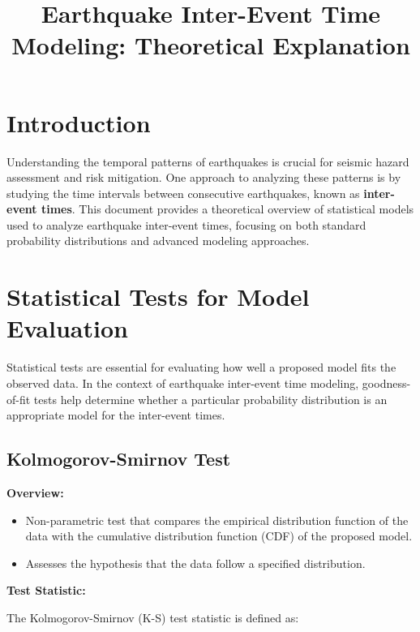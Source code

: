 \documentclass{article}
\begin{document}
\title{Earthquake Inter-Event Time Modeling: Theoretical Explanation}
\author{}
\date{}

\maketitle

\tableofcontents
\newpage

\section{Introduction}

Understanding the temporal patterns of earthquakes is crucial for seismic hazard assessment and risk mitigation. One approach to analyzing these patterns is by studying the time intervals between consecutive earthquakes, known as \textbf{inter-event times}. This document provides a theoretical overview of statistical models used to analyze earthquake inter-event times, focusing on both standard probability distributions and advanced modeling approaches.

\section{Statistical Tests for Model Evaluation}

Statistical tests are essential for evaluating how well a proposed model fits the observed data. In the context of earthquake inter-event time modeling, goodness-of-fit tests help determine whether a particular probability distribution is an appropriate model for the inter-event times.

\subsection{Kolmogorov-Smirnov Test}

\textbf{Overview:}

\begin{itemize}
    \item Non-parametric test that compares the empirical distribution function of the data with the cumulative distribution function (CDF) of the proposed model.
    \item Assesses the hypothesis that the data follow a specified distribution.
\end{itemize}

\textbf{Test Statistic:}

The Kolmogorov-Smirnov (K-S) test statistic is defined as:
\end{document}
